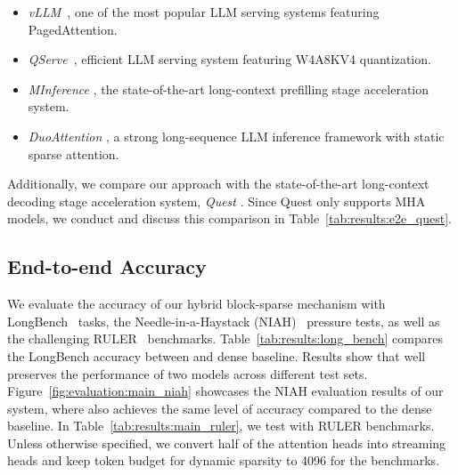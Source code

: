 \begin{itemize}[leftmargin=*, itemsep=-3pt, topsep=-5pt, ]
  \item \emph{vLLM}~\cite{vllm}, one of the most popular LLM serving systems featuring PagedAttention.
  
  \item \emph{QServe}~\cite{lin2024qserve}, efficient LLM serving system featuring W4A8KV4 quantization.
  
  \item \emph{MInference} \cite{jiang2024minference}, the state-of-the-art long-context prefilling stage acceleration system.
  
  \item \emph{DuoAttention} \cite{xiao2024duoattention}, a strong long-sequence LLM inference framework with static sparse attention.
  
\end{itemize}



Additionally, we compare our approach with the state-of-the-art long-context decoding stage acceleration system, \emph{Quest} \cite{tang2024quest}. Since Quest only supports MHA models, we conduct and discuss this comparison in Table~\ref{tab:results:e2e_quest}.



\subsection{End-to-end Accuracy}
\label{sect:results:acc_eval}






We evaluate the accuracy of our hybrid block-sparse mechanism with LongBench~\cite{bai2023longbench} tasks, the Needle-in-a-Haystack (NIAH)~\cite{LLMTest_NeedleInAHaystack} pressure tests, as well as the challenging RULER~\cite{nvidia_ruler} benchmarks.  Table~\ref{tab:results:long_bench} compares the LongBench accuracy between \system and dense baseline. Results show that \system well preserves the performance of two models across different test sets. Figure~\ref{fig:evaluation:main_niah} showcases the NIAH evaluation results of our system, where \system also achieves the same level of accuracy compared to the dense baseline. In Table~\ref{tab:results:main_ruler}, we test \system with RULER benchmarks. Unless otherwise specified, we convert half of the attention heads into streaming heads and keep token budget for dynamic sparsity to 4096 for the benchmarks.



